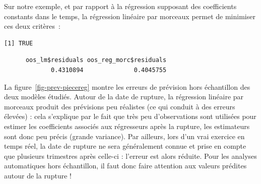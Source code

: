 \documentclass[
  a4paper,
  DIV=11,
  numbers=noendperiod,
  french]{scrartcl}
\newenvironment{Shaded}{\begin{snugshade}}{\end{snugshade}}
\newcommand{\AttributeTok}[1]{\textcolor[rgb]{0.40,0.45,0.13}{#1}}
\newcommand{\CommentTok}[1]{\textcolor[rgb]{0.37,0.37,0.37}{#1}}
\newcommand{\DecValTok}[1]{\textcolor[rgb]{0.68,0.00,0.00}{#1}}
\newcommand{\FunctionTok}[1]{\textcolor[rgb]{0.28,0.35,0.67}{#1}}
\newcommand{\NormalTok}[1]{\textcolor[rgb]{0.00,0.23,0.31}{#1}}
\newcommand{\OtherTok}[1]{\textcolor[rgb]{0.00,0.23,0.31}{#1}}
\newcommand{\SpecialCharTok}[1]{\textcolor[rgb]{0.37,0.37,0.37}{#1}}
\newcommand\1{{\mathds 1}}
\theoremstyle{remark}
\begin{document}
Sur notre exemple, et par rapport à la régression supposant des
coefficients constants dans le temps, la régression linéaire par
morceaux permet de minimiser ces deux critères~:

\begin{Shaded}
\end{Shaded}

\begin{verbatim}
[1] TRUE
\end{verbatim}

\begin{Shaded}
\end{Shaded}

\begin{verbatim}
      oos_lm$residuals oos_reg_morc$residuals 
             0.4310894              0.4045755 
\end{verbatim}

La figure~\ref{fig-prev-piecereg} montre les erreurs de prévision hors
échantillon des deux modèles étudiés. Autour de la date de rupture, la
régression linéaire par morceaux produit des prévisions peu réalistes
(ce qui conduit à des erreurs élevées) : cela s'explique par le fait que
très peu d'observations sont utilisées pour estimer les coefficients
associés aux régresseurs après la rupture, les estimateurs sont donc peu
précis (grande variance). Par ailleurs, lors d'un vrai exercice en temps
réel, la date de rupture ne sera généralement connue et prise en compte
que plusieurs trimestres après celle-ci : l'erreur est alors réduite.
Pour les analyses automatiques hors échantillon, il faut donc faire
attention aux valeurs prédites autour de la rupture !
\end{document}

